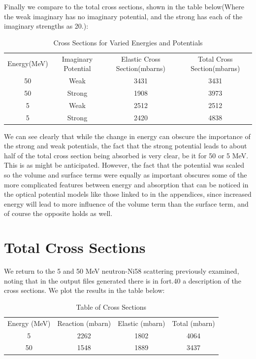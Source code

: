 \documentclass[paper=a4, fontsize=11pt]{scrartcl} %
\numberwithin{equation}{section} %
\numberwithin{figure}{section} %
\numberwithin{table}{section} %
\begin{document}
Finally we compare to the total cross sections, shown in the table below(Where the weak imaginary has no imaginary potential, and the strong has each of the imaginary strengths as 20.):\\
\begin{table}[hbt!]
\centering
\begin{tabular} {|c|c|c|c|}
Energy(MeV) & Imaginary Potential & Elastic Cross Section(mbarns) & Total Cross Section(mbarns)\\
50 & Weak & 3431 & 3431\\
50 & Strong & 1908 & 3973\\
5 & Weak & 2512 & 2512 \\
5 & Strong & 2420 & 4838 \end{tabular}\caption{Cross Sections for Varied Energies and Potentials}\end{table}

We can see clearly that while the change in energy can obscure the importance of the strong and weak potentials, the fact that the strong potential leads to about half of the total cross section being absorbed is very clear, be it for 50 or 5 MeV. This is as might be anticipated. However, the fact that the potential was scaled so the volume and surface terms were equally as important obscures some of the more complicated features between energy and absorption that can be noticed in the optical potential models like those linked to in the appendices, since increased energy will lead to more influence of the volume term than the surface term, and of course the opposite holds as well. 

\section{Total Cross Sections}

We return to the 5 and 50 MeV neutron-Ni58 scattering previously examined, noting that in the output files generated there is in fort.40 a description of the cross sections. We plot the results in the table below:\\

\begin{table}[hbt!]
\centering
\begin{tabular}{|c|c|c|c|}
Energy (MeV) & Reaction  (mbarn) & Elastic (mbarn)& Total (mbarn)\\
5 & 2262 & 1802 & 4064 \\
50 & 1548 &1889 & 3437 
\end{tabular}
\caption{Table of Cross Sections}
\end{table}
\end{document}

